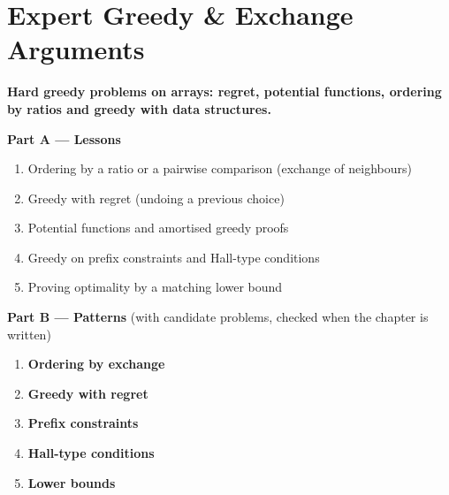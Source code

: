 \chapter{Expert Greedy \& Exchange Arguments}
\label{ch:expert_greedy}

\begin{tcolorbox}[enhanced, colback=white, colframe=secondaryblue, boxrule=1pt, arc=2mm]
\textbf{\large\textcolor{primaryblue}{Hard greedy problems on arrays: regret, potential functions, ordering by ratios and greedy with data structures.}}
\end{tcolorbox}


\begin{plannedbox}
\textbf{Part A --- Lessons}
\begin{enumerate}[leftmargin=*, label=\textbf{A\arabic*.}, itemsep=1pt]
    \item Ordering by a ratio or a pairwise comparison (exchange of neighbours)
    \item Greedy with regret (undoing a previous choice)
    \item Potential functions and amortised greedy proofs
    \item Greedy on prefix constraints and Hall-type conditions
    \item Proving optimality by a matching lower bound
\end{enumerate}
\textbf{Part B --- Patterns} (with candidate problems, checked when the chapter is written)
\begin{enumerate}[leftmargin=*, label=\textbf{P\arabic*.}, itemsep=1pt]
    \item \textbf{Ordering by exchange}
    \item \textbf{Greedy with regret}
    \item \textbf{Prefix constraints}
    \item \textbf{Hall-type conditions}
    \item \textbf{Lower bounds}
\end{enumerate}
\end{plannedbox}
